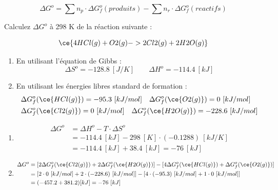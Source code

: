 \documentclass[
  11pt,
  a4paper,
  openany]{book}
\providecommand{\tightlist}{%
  \setlength{\itemsep}{0pt}\setlength{\parskip}{0pt}}
\begin{document}
\[
\Delta G^o = \sum n_p \cdot \Delta G^{o}_f(produits) - \sum n_r \cdot \Delta G^{o}_f(reactifs)
\]

\begin{Exercise}

Calculez \(\Delta G^o\) à 298 K de la réaction suivante :

\[ \ce{4 HCl(g) + O2(g) -> 2 Cl2(g) + 2 H2O(g)} \]

\begin{enumerate}
\def\labelenumi{\alph{enumi}.}
\tightlist
\item
  En utilisant l'équation de Gibbs :
  \[
  \Delta S^o = -128.8\ [J/K] \qquad \Delta H^o = -114.4\ [kJ]
  \]
\item
  En utilisant les énergies libres standard de formation :
  \[
  \begin{split}
  & \Delta G^o_f(\ce{HCl(g)}) = -95.3\ [kJ/mol] \quad \Delta G^o_f(\ce{O2(g)}) = 0\ [kJ/mol] \\
  & \Delta G^o_f(\ce{Cl2(g)}) = 0\ [kJ/mol] \quad \Delta G^o_f(\ce{H2O(g)}) = -228.6\ [kJ/mol]
  \end{split}
  \]
\end{enumerate}

\end{Exercise}

\begin{Answer}

\begin{enumerate}
\def\labelenumi{\alph{enumi}.}
\tightlist
\item
  \[
  \begin{split}
  \Delta G^o &= \Delta H^o - T \cdot \Delta S^o \\
   &= -114.4\ [kJ] - 298\ [K] \cdot (-0.1288)\ [kJ/K] \\
   &= -114.4\ [kJ] + 38.4\ [kJ] = -76\ [kJ]
  \end{split}
  \]
\item
  \[
  \begin{split}
  \Delta G^o &= [2 \Delta G^o_f(\ce{Cl2(g)}) + 2 \Delta G^o_f(\ce{H2O(g)})] - [4 \Delta G^o_f(\ce{HCl(g)}) + \Delta G^o_f(\ce{O2(g)})] \\
   &= [2 \cdot 0\ [kJ/mol] + 2 \cdot (-228.6)\ [kJ/mol]] - [4 \cdot (-95.3)\ [kJ/mol] + 1 \cdot 0\ [kJ/mol]] \\
   &= (-457.2 + 381.2) [kJ] = -76\ [kJ]
  \end{split}
  \]
\end{enumerate}

\end{Answer}
\end{document}
